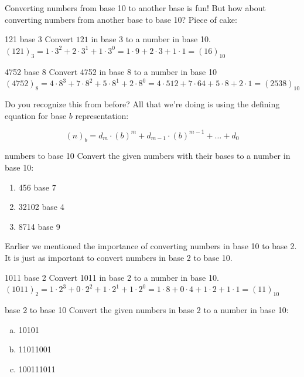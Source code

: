 Converting numbers from base 10 to another base is fun! But how about converting numbers from another base to base 10? Piece of cake:

\begin{example}{121 base 3}
Convert $121$ in base $3$ to a number in base 10.\\

$(121)_{3}=1\cdot 3^{2}+2\cdot 3^{1}+1\cdot 3^{0}=1\cdot 9+2\cdot 3+1\cdot 1=(16)_{10}$
\end{example}

\begin{example}{4752 base 8}
Convert 4752 in base 8 to a number in base 10\\

$(4752)_{8}=4\cdot 8^{3}+7\cdot 8^{2}+5\cdot 8^{1}+2\cdot 8^{0}=4\cdot 512+7\cdot 64+5\cdot 8+2\cdot 1=(2538)_{10}$
\end{example}

Do you recognize this from before? All that we're doing is using the defining equation for base $b$ representation:

\begin{equation}
(n)_{b}=d_{m}\cdot (b)^{m}+d_{m-1}\cdot (b)^{m-1}+\hdots+d_{0}
\end{equation}

\begin{exercise}{numbers to base 10}
Convert the given numbers with their bases to a number in base 10:
\begin{enumerate}
\item 456 base 7
\item 32102 base 4
\item 8714 base 9
\end{enumerate}
\end{exercise}

Earlier we mentioned the importance of converting numbers in base 10 to base 2. It is just as important to convert numbers in base 2 to base 10.

\begin{example}{1011 base 2}
Convert 1011 in base 2 to a number in base 10.\\

$(1011)_{2}=1\cdot 2^{3}+0\cdot 2^{2}+1\cdot 2^{1}+1\cdot 2^{0}=1\cdot 8+0\cdot 4+1\cdot 2+1\cdot 1=(11)_{10}$
\end{example}

\begin{exercise}{base 2 to base 10}
Convert the given numbers in base 2 to a number in base 10:
\begin{enumerate}[(a)]
\item 10101
\item 11011001
\item 100111011
\end{enumerate}
\end{exercise}

